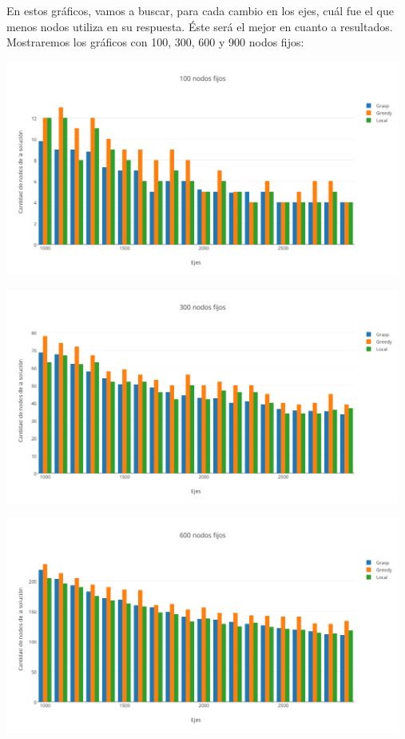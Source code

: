 En estos gr\'aficos, vamos a buscar, para cada cambio en los ejes, cu\'al fue el que menos nodos utiliza en su respuesta. \'Este ser\'a el mejor en cuanto a resultados.\\

Mostraremos los gr\'aficos con 100, 300, 600 y 900 nodos fijos:

\begin{center}
 	\includegraphics[width=13cm, keepaspectratio=yes]{imagenes/6/100NodosFijos.png}

 	\includegraphics[width=13cm, keepaspectratio=yes]{imagenes/6/300NodosFijos.png}
 
 	\includegraphics[width=13cm, keepaspectratio=yes]{imagenes/6/600NodosFijos.png}
 

\end{center}
